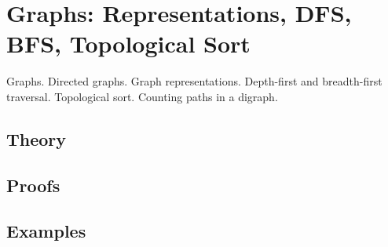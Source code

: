 
\section{Graphs: Representations, DFS, BFS, Topological Sort}
\label{sec:1.3.06-graphs-traversal}

\begin{ticket}
Graphs. Directed graphs. Graph representations. Depth-first and breadth-first traversal. Topological sort. Counting paths in a digraph.
\end{ticket}

\subsection*{Theory}

\subsection*{Proofs}

\subsection*{Examples}
